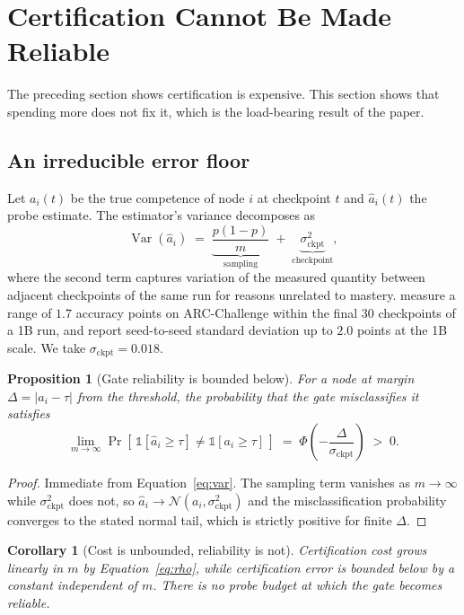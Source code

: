 \documentclass[11pt]{article}
\theoremstyle{plain}
\newtheorem{proposition}{Proposition}
\newtheorem{corollary}{Corollary}
\theoremstyle{definition}
\theoremstyle{remark}
\begin{document}
\section{Certification Cannot Be Made Reliable}
\label{sec:reliability}

The preceding section shows certification is expensive. This section shows that
spending more does not fix it, which is the load-bearing result of the paper.

\subsection{An irreducible error floor}

Let $a_i(t)$ be the true competence of node $i$ at checkpoint $t$ and
$\hat{a}_i(t)$ the probe estimate. The estimator's variance decomposes as
\begin{equation}
\operatorname{Var}(\hat{a}_i) \;=\; \underbrace{\frac{p(1-p)}{m}}_{\text{sampling}}
\;+\; \underbrace{\sigma^2_{\text{ckpt}}}_{\text{checkpoint}},
\label{eq:var}
\end{equation}
where the second term captures variation of the measured quantity between
adjacent checkpoints of the same run for reasons unrelated to mastery.
\citet{heineman2025signal} measure a range of $1.7$ accuracy points on
ARC-Challenge within the final 30 checkpoints of a 1B run, and
\citet{magnusson2025datadecide} report seed-to-seed standard deviation up to
$2.0$ points at the 1B scale. We take $\sigma_{\text{ckpt}} = 0.018$.

\begin{proposition}[Gate reliability is bounded below]
\label{prop:floor}
For a node at margin $\Delta = |a_i - \tau|$ from the threshold, the probability
that the gate misclassifies it satisfies
\[
\lim_{m \to \infty} \Pr\!\left[\,\mathbb{1}[\hat{a}_i \ge \tau] \neq \mathbb{1}[a_i \ge \tau]\,\right]
\;=\; \Phi\!\left(-\frac{\Delta}{\sigma_{\text{ckpt}}}\right) \;>\; 0 .
\]
\end{proposition}

\begin{proof}
Immediate from Equation~\ref{eq:var}. The sampling term vanishes as $m \to
\infty$ while $\sigma^2_{\text{ckpt}}$ does not, so $\hat{a}_i \to
\mathcal{N}(a_i, \sigma^2_{\text{ckpt}})$ and the misclassification probability
converges to the stated normal tail, which is strictly positive for finite
$\Delta$.
\end{proof}

\begin{corollary}[Cost is unbounded, reliability is not]
Certification cost grows linearly in $m$ by Equation~\ref{eq:rho}, while
certification error is bounded below by a constant independent of $m$. There is
no probe budget at which the gate becomes reliable.
\end{corollary}
\end{document}
